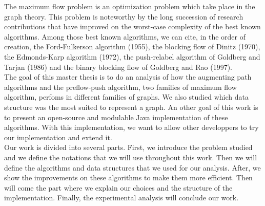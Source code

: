 The maximum flow problem is an optimization problem which take place in the graph theory. This problem is noteworthy by the long succession of research contributions that have improved on the worst-case complexity of the best known algorithms. Among those best known algorithms, we can cite, in the order of creation, the Ford-Fulkerson algorithm (1955), the blocking flow of Dinitz (1970), the Edmonds-Karp algorithm (1972), the push-relabel algorithm of Goldberg and Tarjan (1986) and the binary blocking flow of Goldberg and Rao (1997). \\

The goal of this master thesis is to do an analysis of how the augmenting path algorithms and the preflow-push algorithm, two families of maximum flow algorithm, perfoms in different families of graphs. We also studied which data structure was the most suited to represent a graph. An other goal of this work is to present an open-source and modulable Java implementation of these algorithms. With this implementation, we want to allow other developpers to try our implementation and extend it. \\


Our work is divided into several parts. First, we introduce the problem studied and we define the notations that we will use throughout this work. Then we will define the algorithms and data structures that we used for our analysis. After, we show the improvements on these algorithms to make them more efficient. Then will come the part where we explain our choices and the structure of the implementation. Finally, the experimental analysis will conclude our work.\\



